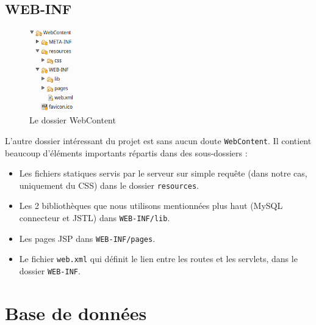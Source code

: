 \subsection{WEB-INF}

\begin{figure}
  \vspace{-20pt}
  \begin{center}
    \includegraphics[width=0.18\textwidth]{images/web_archi.png}
  \end{center}
  \vspace{-10pt}
  \caption{Le dossier WebContent}
  \vspace{-2.7cm}
\end{figure}

L'autre dossier intéressant du projet est sans aucun doute \lstinline{WebContent}. Il contient beaucoup d'éléments importants répartis dans des sous-dossiers :

\begin{itemize}
    \item Les fichiers statiques servis par le serveur sur simple requête (dans notre cas, uniquement du CSS) dans le dossier \lstinline{resources}.
    \item Les 2 bibliothèques que nous utilisons mentionnées plus haut (MySQL connecteur et JSTL) dans \lstinline{WEB-INF/lib}.
    \item Les pages JSP dans \lstinline{WEB-INF/pages}.
    \item Le fichier \lstinline{web.xml} qui définit le lien entre les routes et les servlets, dans le dossier \lstinline{WEB-INF}.
\end{itemize}

\newpage

\section{Base de données}

